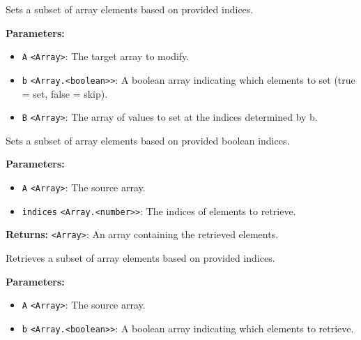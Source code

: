 \documentclass[12pt,a4paper]{article}
\begin{document}
\noindent Sets a subset of array elements based on provided indices.

\vspace{5mm}
\noindent {}


\noindent \textbf{Parameters:}
\begin{itemize}
  \item \texttt{A} \texttt{<Array>}: The target array to modify.
  \item \texttt{b} \texttt{<Array.<boolean>>}: A boolean array indicating which elements to set (true = set, false = skip).
  \item \texttt{B} \texttt{<Array>}: The array of values to set at the indices determined by \textasciigrave{}b\textasciigrave{}.
\end{itemize}

\noindent Sets a subset of array elements based on provided boolean indices.

\vspace{5mm}
\noindent {}


\noindent \textbf{Parameters:}
\begin{itemize}
  \item \texttt{A} \texttt{<Array>}: The source array.
  \item \texttt{indices} \texttt{<Array.<number>>}: The indices of elements to retrieve.
\end{itemize}

\noindent \textbf{Returns:} \texttt{<Array>}: An array containing the retrieved elements.

\noindent Retrieves a subset of array elements based on provided indices.

\vspace{5mm}
\noindent {}


\noindent \textbf{Parameters:}
\begin{itemize}
  \item \texttt{A} \texttt{<Array>}: The source array.
  \item \texttt{b} \texttt{<Array.<boolean>>}: A boolean array indicating which elements to retrieve.
\end{itemize}
\end{document}
